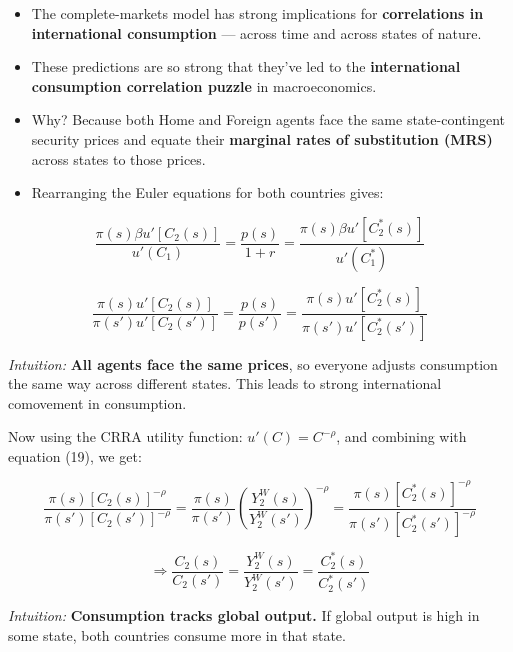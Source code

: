 \documentclass[12pt]{article}
\begin{document}
\begin{itemize}
    \item The complete-markets model has strong implications for \textbf{correlations in international consumption} — across time and across states of nature.
    
    \item These predictions are so strong that they’ve led to the \textbf{international consumption correlation puzzle} in macroeconomics.
    
    \item Why? Because both Home and Foreign agents face the same state-contingent security prices and equate their \textbf{marginal rates of substitution (MRS)} across states to those prices.
    
    \item Rearranging the Euler equations for both countries gives:
\end{itemize}

\begin{equation}
    \frac{\pi(s) \beta u'[C_2(s)]}{u'(C_1)} = \frac{p(s)}{1+r} = \frac{\pi(s) \beta u'[C_2^*(s)]}{u'(C_1^*)}
    \tag{22}
\end{equation}

\begin{equation}
    \frac{\pi(s) u'[C_2(s)]}{\pi(s') u'[C_2(s')]} = \frac{p(s)}{p(s')} = \frac{\pi(s) u'[C_2^*(s)]}{\pi(s') u'[C_2^*(s')]}
    \tag{23}
\end{equation}

\textit{Intuition:} \textbf{All agents face the same prices}, so everyone adjusts consumption the same way across different states. This leads to strong international comovement in consumption.

\vspace{0.5em}

Now using the CRRA utility function: \( u'(C) = C^{-\rho} \), and combining with equation (19), we get:

\begin{equation}
    \frac{\pi(s)[C_2(s)]^{-\rho}}{\pi(s')[C_2(s')]^{-\rho}} = 
    \frac{\pi(s)}{\pi(s')} \left( \frac{Y_2^W(s)}{Y_2^W(s')} \right)^{-\rho}
    = \frac{\pi(s)[C_2^*(s)]^{-\rho}}{\pi(s')[C_2^*(s')]^{-\rho}}
\end{equation}

\[
\Rightarrow \frac{C_2(s)}{C_2(s')} = \frac{Y_2^W(s)}{Y_2^W(s')} = \frac{C_2^*(s)}{C_2^*(s')}
\tag{24}
\]

\textit{Intuition:} \textbf{Consumption tracks global output.} If global output is high in some state, both countries consume more in that state.
\end{document}
